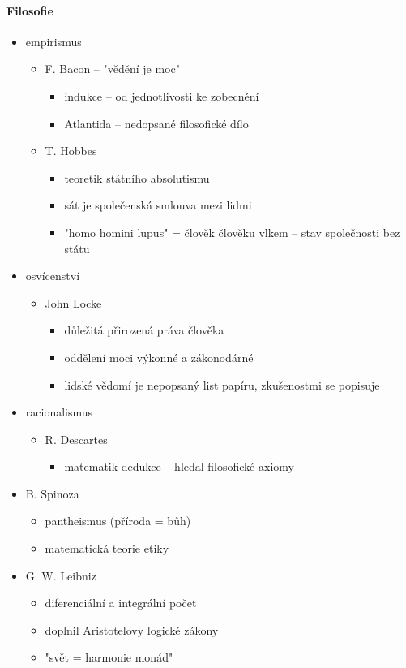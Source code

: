 \paragraph{Filosofie}
\begin{itemize}
\item empirismus
	\begin{itemize}
	\item F. Bacon -- "vědění je moc"
		\begin{itemize}
		\item indukce -- od jednotlivosti ke zobecnění
		\item Atlantida -- nedopsané filosofické dílo
		\end{itemize}
	\item T. Hobbes
		\begin{itemize}
		\item teoretik státního absolutismu
		\item sát je společenská smlouva mezi lidmi
		\item "homo homini lupus" = člověk člověku vlkem -- stav společnosti bez státu
		\end{itemize}
	\end{itemize}
\item osvícenství
	\begin{itemize}
	\item John Locke
		\begin{itemize}
		\item důležitá přirozená práva člověka
		\item oddělení moci výkonné a zákonodárné
		\item lidské vědomí je nepopsaný list papíru, zkušenostmi se popisuje
		\end{itemize}
	\end{itemize}
\item racionalismus
	\begin{itemize}
	\item R. Descartes
		\begin{itemize}
		\item matematik \ra dedukce -- hledal filosofické axiomy
		\end{itemize}
	\end{itemize}
	\item B. Spinoza
		\begin{itemize}
		\item pantheismus (příroda = bůh)
		\item matematická teorie etiky
		\end{itemize}
	\item G. W. Leibniz
		\begin{itemize}
		\item diferenciální a integrální počet
		\item doplnil Aristotelovy logické zákony
		\item "svět = harmonie monád"
		\end{itemize}

\end{itemize}

